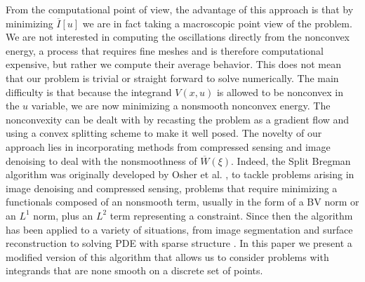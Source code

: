 \documentclass[11pt]{article}
\theoremstyle{plain}
\begin{document}
From the computational point of view, the advantage of this approach is that by minimizing $\overline{I}[u]$ we are in fact  taking a macroscopic point view of the problem. We are not interested in computing the oscillations directly from the nonconvex energy, a process that requires fine meshes and is therefore computational expensive, but rather we compute their average behavior. This does not mean that our problem is trivial or straight forward to solve numerically. The main difficulty is that because the integrand $V(x,u)$ is allowed to be nonconvex in the $u$ variable, we are now minimizing a nonsmooth nonconvex energy.  The nonconvexity can be dealt with by recasting the problem as a gradient flow and using a convex splitting scheme to make it well posed. The novelty of our approach lies in incorporating methods from compressed sensing and image denoising to deal with the nonsmoothness of $\overline{W}(\xi)$. Indeed, the Split Bregman algorithm was originally developed by Osher et al. \cite{osher2005,goldstein2009}, to tackle problems arising in image denoising and compressed sensing, problems that require minimizing a functionals composed of an nonsmooth term, usually in the form of a BV norm or an $L^1$ norm,  plus an $L^2$ term representing a constraint. Since then the algorithm has been applied to a variety of situations, from image segmentation and surface reconstruction \cite{goldstein2009} to solving PDE with sparse structure \cite{tran2015}. In this paper we present a modified version of this algorithm that allows us to consider problems with integrands that are none smooth on a discrete set of points.
\end{document}
